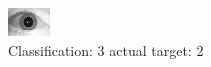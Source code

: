 \begin{figure}[h!]
\begin{center}
\includegraphics[width=0.60\columnwidth]{figures/ID1737_class_3_target_2.png}
\end{center}
\caption{ Classification: 3 actual target: 2}
\label{fig:ID1737_class_3_target_2}
\end{figure}

